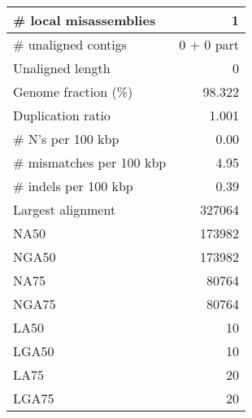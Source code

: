 \documentclass[12pt,a4paper]{article}
\begin{document}
\begin{table}[ht]
\begin{center}
\begin{tabular}{|l*{1}{|r}|}
\# local misassemblies & 1 \\ \hline
\# unaligned contigs & 0 + 0 part \\ \hline
Unaligned length & 0 \\ \hline
Genome fraction (\%) & 98.322 \\ \hline
Duplication ratio & 1.001 \\ \hline
\# N's per 100 kbp & 0.00 \\ \hline
\# mismatches per 100 kbp & 4.95 \\ \hline
\# indels per 100 kbp & 0.39 \\ \hline
Largest alignment & 327064 \\ \hline
NA50 & 173982 \\ \hline
NGA50 & 173982 \\ \hline
NA75 & 80764 \\ \hline
NGA75 & 80764 \\ \hline
LA50 & 10 \\ \hline
LGA50 & 10 \\ \hline
LA75 & 20 \\ \hline
LGA75 & 20 \\ \hline
\end{tabular}
\end{center}
\end{table}
\end{document}
